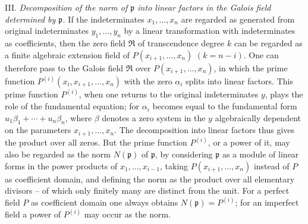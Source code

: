 III. \emph{Decomposition of the norm of $\mathfrak p$ into linear factors in the Galois field determined by $\mathfrak p$.} If the indeterminates $x_1,\ldots,x_n$ are regarded as generated from original indeterminates $y_1,\ldots,y_n$ by a linear transformation with indeterminates as coefficients, then the zero field $\mathfrak R$ of transcendence degree $k$ can be regarded as a finite algebraic extension field of $P(x_{i+1},\ldots,x_n)$ $(k=n-i)$. One can therefore pass to the Galois field $\mathfrak R$ over $P(x_{i+1},\ldots,x_n)$, in which the prime function $P^{(i)}(x_i,x_{i+1},\ldots,x_n)$ with the zero $\alpha_i$ splits into linear factors. This prime function $P^{(i)}$, when one returns to the original indeterminates $y$, plays the role of the fundamental equation; for $\alpha_i$ becomes equal to the fundamental form $u_1\beta_1+\cdots+u_n\beta_n$, where $\beta$ denotes a zero system in the $y$ algebraically dependent on the parameters $x_{i+1},\ldots,x_n$. The decomposition into linear factors thus gives the product over all zeros. But the prime function $P^{(i)}$, or a power of it, may also be regarded as the norm $N(\mathfrak p)$ of $\mathfrak p$, by considering $\mathfrak p$ as a module of linear forms in the power products of $x_1,\ldots,x_{i-1}$, taking $P(x_{i+1},\ldots,x_n)$ instead of $P$ as coefficient domain, and defining the norm as the product over all elementary divisors -- of which only finitely many are distinct from the unit. For a perfect field $P$ as coefficient domain one always obtains $N(\mathfrak p)=P^{(i)}$; for an imperfect field a power of $P^{(i)}$ may occur as the norm.

